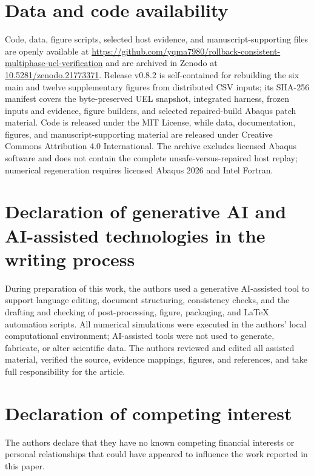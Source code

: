\documentclass[preprint,12pt,authoryear]{elsarticle}
\begin{document}
\section*{Data and code availability}

Code, data, figure scripts, selected host evidence, and manuscript-supporting files are openly available at \url{https://github.com/yqma7980/rollback-consistent-multiphase-uel-verification} and are archived in Zenodo at \href{https://doi.org/10.5281/zenodo.21773371}{10.5281/zenodo.21773371}. Release v0.8.2 is self-contained for rebuilding the six main and twelve supplementary figures from distributed CSV inputs; its SHA-256 manifest covers the byte-preserved UEL snapshot, integrated harness, frozen inputs and evidence, figure builders, and selected repaired-build Abaqus patch material. Code is released under the MIT License, while data, documentation, figures, and manuscript-supporting material are released under Creative Commons Attribution 4.0 International. The archive excludes licensed Abaqus software and does not contain the complete unsafe-versus-repaired host replay; numerical regeneration requires licensed Abaqus 2026 and Intel Fortran.

\section*{Declaration of generative AI and AI-assisted technologies in the writing process}

During preparation of this work, the authors used a generative AI-assisted tool to support language editing, document structuring, consistency checks, and the drafting and checking of post-processing, figure, packaging, and LaTeX automation scripts. All numerical simulations were executed in the authors' local computational environment; AI-assisted tools were not used to generate, fabricate, or alter scientific data. The authors reviewed and edited all assisted material, verified the source, evidence mappings, figures, and references, and take full responsibility for the article.

\section*{Declaration of competing interest}

The authors declare that they have no known competing financial interests or personal relationships that could have appeared to influence the work reported in this paper.
\end{document}
